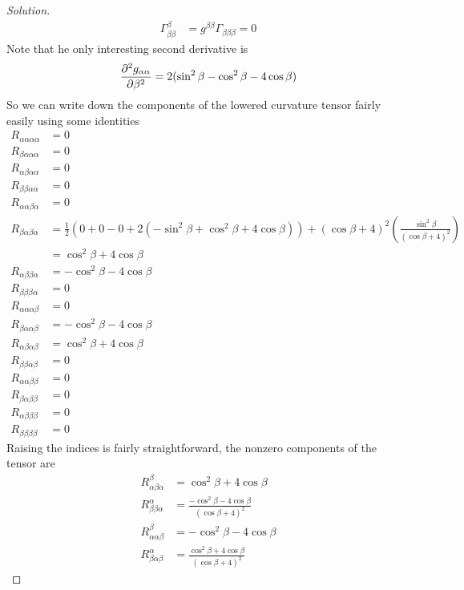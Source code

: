 \documentclass[a4paper]{article}
\begin{document}
\begin{proof}[Solution]
\[\begin{aligned}
    \Gamma^\beta_{\beta \beta} &= g^{\beta \beta} \Gamma_{\beta \beta \beta} = 0
    \end{aligned}
  \]
  Note that he only interesting second derivative is
  \[
    \pdv[2]{g_{\alpha \alpha}}{\beta} = 2(\sin^2 \beta - \cos^2 \beta - 4 \cos \beta)
  \]
  So we can write down the components of the lowered curvature tensor fairly easily using some identities
  \[
    \begin{aligned}
      R_{\alpha \alpha \alpha \alpha} &= 0 \\
      R_{\beta \alpha \alpha \alpha} &= 0 \\
      R_{\alpha \beta \alpha \alpha} &= 0 \\
      R_{\beta \beta \alpha \alpha} &= 0 \\
      R_{\alpha \alpha \beta \alpha} &= 0 \\
      R_{\beta \alpha \beta \alpha} &= \frac{1}{2} \left(0 + 0 - 0 + 2(-\sin^2 \beta + \cos^2 \beta + 4 \cos \beta) \right) + \left( \cos \beta + 4\right)^2\left(\frac{\sin^2 \beta}{(\cos \beta + 4)^2}\right)  \\
                                    &= \cos^2 \beta + 4 \cos \beta \\
      R_{\alpha \beta \beta \alpha} &= -\cos^2 \beta - 4 \cos \beta \\
      R_{\beta \beta \beta \alpha} &= 0 \\
      R_{\alpha \alpha \alpha \beta} &= 0 \\
      R_{\beta \alpha \alpha \beta} &= - \cos^2 \beta - 4 \cos \beta \\
      R_{\alpha \beta \alpha \beta} &= \cos^2 \beta + 4 \cos \beta \\
      R_{\beta \beta \alpha \beta} &= 0 \\
      R_{\alpha \alpha \beta \beta} &= 0 \\
      R_{\beta \alpha \beta \beta} &= 0 \\
      R_{\alpha \beta \beta \beta} &= 0 \\
      R_{\beta \beta \beta \beta} &= 0
    \end{aligned}
  \]
  Raising the indices is fairly straightforward, the nonzero components of the tensor are
  \[
    \begin{aligned}
      R^\beta_{\alpha \beta \alpha} &= \cos^2 \beta + 4 \cos \beta \\
      R^\alpha_{\beta \beta \alpha} &= \frac{-\cos^2 \beta - 4 \cos \beta}{(\cos \beta + 4)^2} \\
      R^\beta_{\alpha \alpha \beta} &= - \cos^2 \beta - 4 \cos \beta \\
      R^\alpha_{\beta \alpha \beta} &= \frac{\cos^2 \beta + 4 \cos \beta}{(\cos \beta + 4)^2}
    \end{aligned}
  \]
\end{proof}
\end{document}
